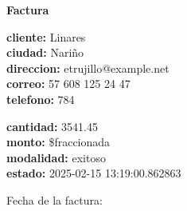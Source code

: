\documentclass{article}
\begin{document}
\begin{center}
    {\LARGE \textbf{Factura}}\\[1cm]
\end{center}

\textbf{cliente:} Linares \\
\textbf{ciudad:} Nariño \\
\textbf{direccion:} etrujillo@example.net \\
\textbf{correo:} 57 608 125 24 47 \\
\textbf{telefono:} 784 \\

\vspace{0.5cm}

\textbf{cantidad:} 3541.45 \\
\textbf{monto:} \$fraccionada \\
\textbf{modalidad:} exitoso \\
\textbf{estado:} 2025-02-15 13:19:00.862863 \\

\vspace{1cm}

Fecha de la factura: 
\end{document}
